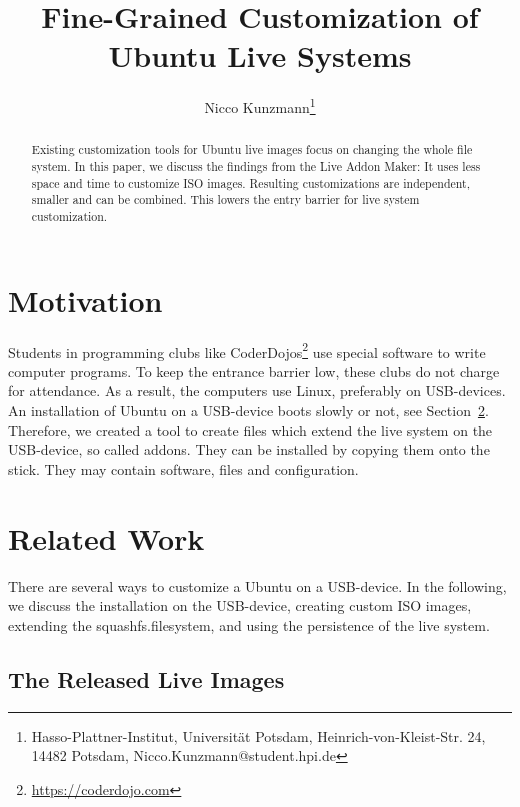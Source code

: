 \documentclass[english]{lni}
\author{Nicco Kunzmann\footnote{Hasso-Plattner-Institut, Universität Potsdam, Heinrich-von-Kleist-Str. 24, 14482 Potsdam, Nicco.Kunzmann@student.hpi.de} 
}
\title{Fine-Grained Customization of Ubuntu Live Systems}
\begin{document}
\maketitle
\renewcommand{\refname}{Literaturverzeichnis}
\setcounter{footnote}{2} %

\begin{abstract}
Existing customization tools for Ubuntu live images focus on changing the whole file system.
In this paper, we discuss the findings from the Live Addon Maker:
It uses less space and time to customize ISO images.
Resulting customizations are independent, smaller and can be combined.
This lowers the entry barrier for live system customization.
\end{abstract}
\begin{keywords}
\end{keywords}

\section{Motivation}

Students in programming clubs like CoderDojos\footnote{\url{https://coderdojo.com}} use special software to write computer programs.
To keep the entrance barrier low, these clubs do not charge for attendance.
As a result, the computers use Linux, preferably on USB-devices.
An installation of Ubuntu on a USB-device boots slowly or not, see Section~\ref{sec:related}.
Therefore, we created a tool to create files which extend the live system on the  USB-device, so called addons.
They can be installed by copying them onto the stick.
They may contain software, files and configuration.

\section{Related Work}
\label{sec:related}

There are several ways to customize a Ubuntu on a USB-device.
In the following, we discuss the installation on the USB-device, creating custom ISO images, extending the squashfs.filesystem, and using the persistence of the live system.

\subsection{The Released Live Images}
\end{document}
